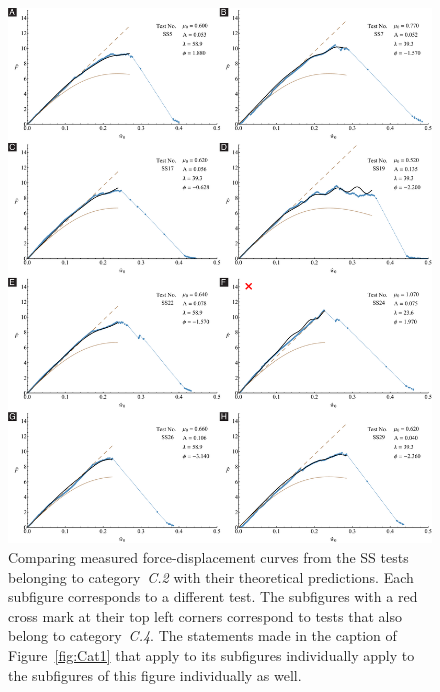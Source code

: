 \documentclass[preprint,10pt,times]{elsarticle}
\numberwithin{equation}{section}
\begin{document}
\begin{figure}
\begin{centering}
\includegraphics[width=1\textwidth]{../Figures_Submit/Cat2.pdf}
\par\end{centering}
\centering{}
\caption{
\label{fig:Cat2}
Comparing measured force-displacement curves from the SS tests belonging to category~\textit{C.2} with their theoretical predictions.
Each subfigure corresponds to a different test.
The subfigures with a red cross mark at their top left corners correspond to tests that also belong to category~\textit{C.4}.
The statements made in the caption of Figure~\ref{fig:Cat1} that apply  to its subfigures individually apply to the subfigures of this figure individually as well.
}
\end{figure}
\end{document}
